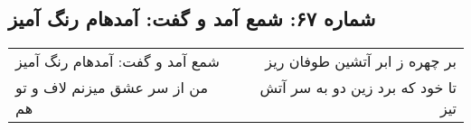 \begin{center}
\section*{شماره ۶۷: شمع آمد و گفت: آمدهام رنگ آمیز}
\label{sec:067}
\begin{longtable}{l p{0.5cm} r}
شمع آمد و گفت: آمدهام رنگ آمیز
&&
بر چهره ز ابر آتشین طوفان ریز
\\
من از سر عشق میزنم لاف و تو هم
&&
تا خود که برد زین دو به سر آتش تیز
\\
\end{longtable}
\end{center}
